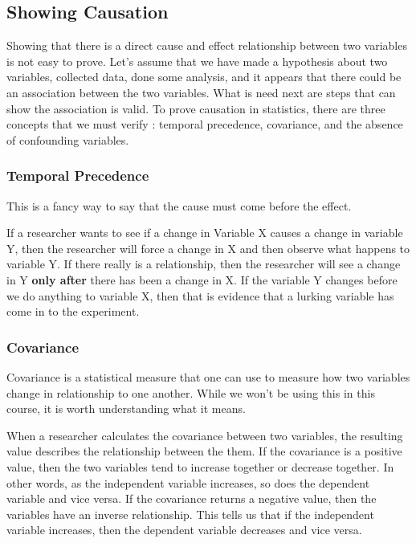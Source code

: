 \documentclass[
  letterpaper,
  DIV=11,
  numbers=noendperiod]{scrreprt}
\begin{document}
\subsection*{Showing Causation}\label{showing-causation}

Showing that there is a direct cause and effect relationship between two
variables is not easy to prove. Let's assume that we have made a
hypothesis about two variables, collected data, done some analysis, and
it appears that there could be an association between the two variables.
What is need next are steps that can show the association is valid. To
prove causation in statistics, there are three concepts that we must
verify : temporal precedence, covariance, and the absence of confounding
variables.

\subsubsection*{Temporal Precedence}\label{temporal-precedence}

This is a fancy way to say that the cause must come before the effect.

If a researcher wants to see if a change in Variable X causes a change
in variable Y, then the researcher will force a change in X and then
observe what happens to variable Y. If there really is a relationship,
then the researcher will see a change in Y \textbf{only after} there has
been a change in X. If the variable Y changes before we do anything to
variable X, then that is evidence that a lurking variable has come in to
the experiment.

\subsubsection*{Covariance}\label{covariance}

Covariance is a statistical measure that one can use to measure how two
variables change in relationship to one another. While we won't be using
this in this course, it is worth understanding what it means.

When a researcher calculates the covariance between two variables, the
resulting value describes the relationship between the them. If the
covariance is a positive value, then the two variables tend to increase
together or decrease together. In other words, as the independent
variable increases, so does the dependent variable and vice versa. If
the covariance returns a negative value, then the variables have an
inverse relationship. This tells us that if the independent variable
increases, then the dependent variable decreases and vice versa.
\end{document}
